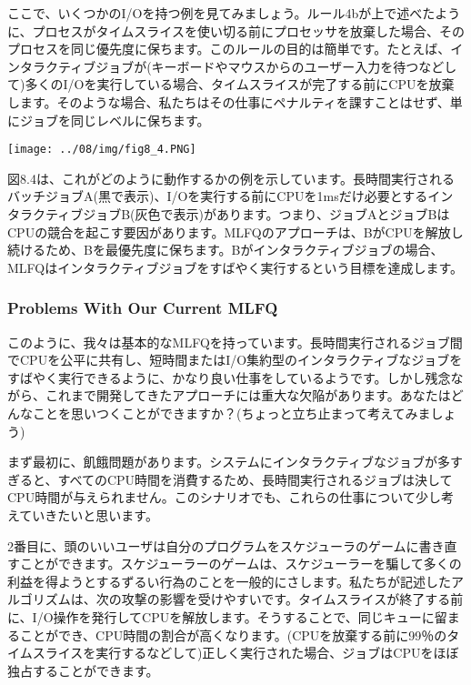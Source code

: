 ここで、いくつかのI/Oを持つ例を見てみましょう。ルール4bが上で述べたように、プロセスがタイムスライスを使い切る前にプロセッサを放棄した場合、そのプロセスを同じ優先度に保ちます。このルールの目的は簡単です。たとえば、インタラクティブジョブが(キーボードやマウスからのユーザー入力を待つなどして)多くのI/Oを実行している場合、タイムスライスが完了する前にCPUを放棄します。そのような場合、私たちはその仕事にペナルティを課すことはせず、単にジョブを同じレベルに保ちます。

\texttt{[image: ../08/img/fig8\_4.PNG]}

図8.4は、これがどのように動作するかの例を示しています。長時間実行されるバッチジョブA(黒で表示)、I/Oを実行する前にCPUを1msだけ必要とするインタラクティブジョブB(灰色で表示)があります。つまり、ジョブAとジョブBはCPUの競合を起こす要因があります。MLFQのアプローチは、BがCPUを解放し続けるため、Bを最優先度に保ちます。Bがインタラクティブジョブの場合、MLFQはインタラクティブジョブをすばやく実行するという目標を達成します。

\hypertarget{problems-with-our-current-mlfq}{%
\subsubsection*{Problems With Our Current
MLFQ}\label{problems-with-our-current-mlfq}}

このように、我々は基本的なMLFQを持っています。長時間実行されるジョブ間でCPUを公平に共有し、短時間またはI/O集約型のインタラクティブなジョブをすばやく実行できるように、かなり良い仕事をしているようです。しかし残念ながら、これまで開発してきたアプローチには重大な欠陥があります。あなたはどんなことを思いつくことができますか？(ちょっと立ち止まって考えてみましょう)

まず最初に、飢餓問題があります。システムにインタラクティブなジョブが多すぎると、すべてのCPU時間を消費するため、長時間実行されるジョブは決してCPU時間が与えられません。このシナリオでも、これらの仕事について少し考えていきたいと思います。

2番目に、頭のいいユーザは自分のプログラムをスケジューラのゲームに書き直すことができます。スケジューラーのゲームは、スケジューラーを騙して多くの利益を得ようとするずるい行為のことを一般的にさします。私たちが記述したアルゴリズムは、次の攻撃の影響を受けやすいです。タイムスライスが終了する前に、I/O操作を発行してCPUを解放します。そうすることで、同じキューに留まることができ、CPU時間の割合が高くなります。(CPUを放棄する前に99％のタイムスライスを実行するなどして)正しく実行された場合、ジョブはCPUをほぼ独占することができます。

